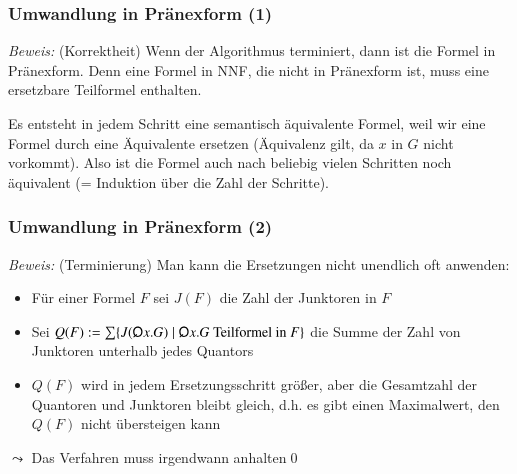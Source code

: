 \documentclass[onlymath]{beamer}
\begin{document}
\begin{frame}[t]\frametitle{Umwandlung in Pränexform (1)}

\pause

\emph{Beweis:} (Korrektheit) Wenn der Algorithmus terminiert, dann ist die Formel in Pränexform.
Denn eine Formel in NNF, die nicht in Pränexform ist, muss eine ersetzbare Teilformel enthalten.\bigskip\pause

Es entsteht in jedem Schritt eine semantisch äquivalente Formel, weil
wir eine Formel durch eine Äquivalente ersetzen (Äquivalenz gilt, da $x$ in $G$ nicht vorkommt). Also ist die Formel auch nach beliebig vielen Schritten noch äquivalent (= Induktion über die Zahl der Schritte).

\end{frame}

\begin{frame}[t]\frametitle{Umwandlung in Pränexform (2)}


\emph{Beweis:} (Terminierung) Man kann die Ersetzungen nicht unendlich oft anwenden:\pause
\begin{itemize}
\item Für einer Formel $F$ sei $J(F)$ die Zahl der Junktoren in $F$
\item Sei $Q(F)\defeq \sum\{J(\quantor x.G)\mid \quantor x.G\text{ Teilformel in }F\}$
die Summe der Zahl von Junktoren unterhalb jedes Quantors\pause
\item $Q(F)$ wird in jedem Ersetzungsschritt größer, aber die Gesamtzahl der Quantoren und Junktoren bleibt gleich, d.h. es gibt
einen Maximalwert, den $Q(F)$ nicht übersteigen kann
\end{itemize}
$\leadsto$ Das Verfahren muss irgendwann anhalten\qed

\end{frame}
\end{document}
